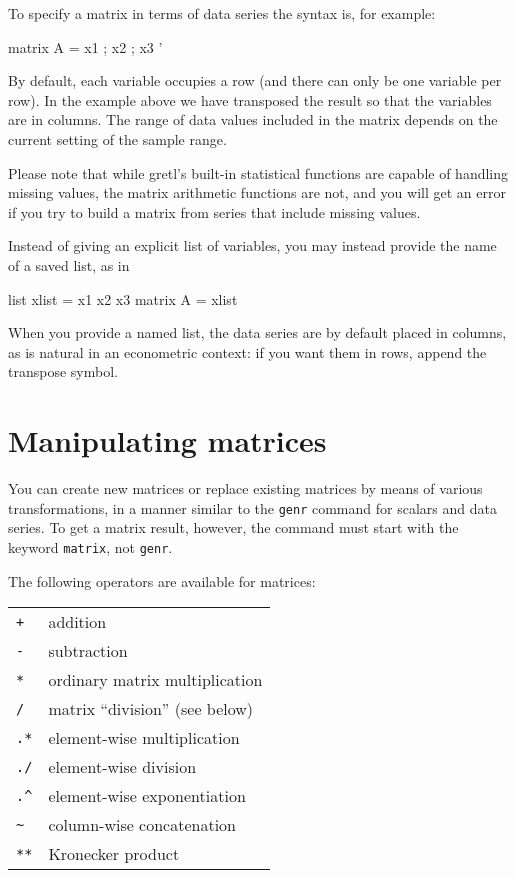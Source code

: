 To specify a matrix in terms of data series the syntax is, for
example:

\begin{code}
matrix A = { x1 ; x2 ; x3 }'
\end{code}

By default, each variable occupies a row (and there can only be one
variable per row).  In the example above we have transposed the result
so that the variables are in columns. The range of data values
included in the matrix depends on the current setting of the sample
range.

Please note that while gretl's built-in statistical functions are
capable of handling missing values, the matrix arithmetic functions
are not, and you will get an error if you try to build a matrix from
series that include missing values.

Instead of giving an explicit list of variables, you may instead
provide the name of a saved list, as in

\begin{code}
list xlist = x1 x2 x3
matrix A = { xlist }
\end{code}

When you provide a named list, the data series are by default placed
in columns, as is natural in an econometric context: if you want them
in rows, append the transpose symbol.

\section{Manipulating matrices}
\label{matrix-manip}

You can create new matrices or replace existing matrices by means of
various transformations, in a manner similar to the \texttt{genr}
command for scalars and data series.  To get a matrix result, however,
the command must start with the keyword \texttt{matrix}, not
\texttt{genr}.

The following operators are available for matrices:

\begin{center}
\begin{tabular}{ll}
\texttt{+} & addition \\
\texttt{-} & subtraction \\
\texttt{*} & ordinary matrix multiplication \\
\texttt{/} & matrix ``division'' (see below) \\
\texttt{.*} & element-wise multiplication \\
\texttt{./} & element-wise division \\
\verb+.^+ & element-wise exponentiation \\
\verb+~+ & column-wise concatenation \\
\texttt{**} & Kronecker product 
\end{tabular}
\end{center}

